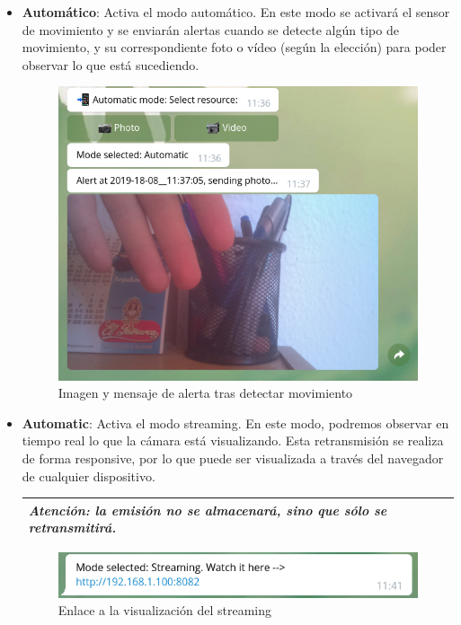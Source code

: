 \begin{itemize}
\item \textbf{Automático}: Activa el modo automático. En este modo se activará el sensor de movimiento y se enviarán alertas cuando se detecte algún tipo de movimiento, y su correspondiente foto o vídeo (según la elección) para poder observar lo que está sucediendo.

\begin{figure}[H]
	\centering
	\includegraphics[scale=0.45]{images/63}
	\caption{Imagen y mensaje de alerta tras detectar movimiento}
\end{figure}

\newpage

\item \textbf{Automatic}: Activa el modo streaming. En este modo, podremos observar en tiempo real lo que la cámara está visualizando. Esta retransmisión se realiza de forma responsive, por lo que puede ser visualizada a través del navegador de cualquier dispositivo.

\begin{tabular}{|p{15.5cm}|}
	
	\hline
	
	\textit{ \textbf{Atención:} la emisión no se almacenará, sino que sólo se retransmitirá.}
	\\
	\hline
	
\end{tabular}

\begin{figure}[H]
	\centering
	\includegraphics[scale=0.45]{images/64}
	\caption{Enlace a la visualización del streaming}
\end{figure}


\end{itemize}
